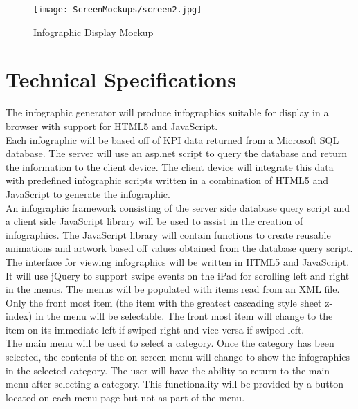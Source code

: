 \documentclass[11pt,a4paper,oneside]{article}
\begin{document}
\begin{figure}[!]
\caption{Infographic Display Mockup\label{mockup-infographic-display}}
\texttt{[image: ScreenMockups/screen2.jpg]}\\
\end{figure}

\section{Technical Specifications}

The infographic generator will produce infographics suitable for display in a browser with support for HTML5 and JavaScript.\\


Each infographic will be based off of KPI data returned from a Microsoft SQL database.  The server will use an asp.net script to query the database and return the information to the client device.  The client device will integrate this data with predefined infographic scripts written in a combination of HTML5 and JavaScript to generate the infographic.\\


An infographic framework consisting of the server side database query script and a client side JavaScript library will be used to assist in the creation of infographics.  The JavaScript library will contain functions to create reusable animations and artwork based off values obtained from the database query script.\\


The interface for viewing infographics will be written in HTML5 and JavaScript.  It will use jQuery to support swipe events on the iPad for scrolling left and right in the menus.  The menus will be populated with items read from an XML file.  Only the front most item (the item with the greatest cascading style sheet z-index) in the menu will be selectable.  The front most item will change to the item on its immediate left if swiped right and vice-versa if swiped left.\\


The main menu will be used to select a category.  Once the category has been selected, the contents of the on-screen menu will change to show the infographics in the selected category.  The user will have the ability to return to the main menu after selecting a category.  This functionality will be provided by a button located on each menu page but not as part of the menu.\\
\end{document}
